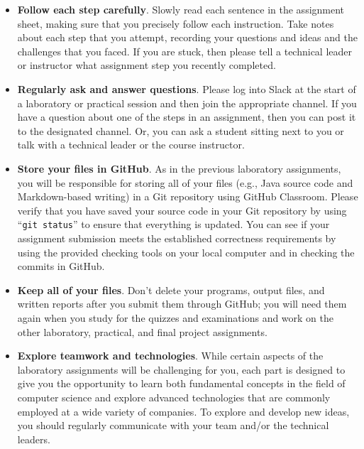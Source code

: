 \documentclass[11pt]{article}
\newcommand{\command}[1]{``\lstinline{#1}''}
\begin{document}
\begin{itemize}
  \setlength{\itemsep}{0pt}

\item {\bf Follow each step carefully}. Slowly read each sentence in the
  assignment sheet, making sure that you precisely follow each instruction. Take
  notes about each step that you attempt, recording your questions and ideas and
  the challenges that you faced. If you are stuck, then please tell a technical
  leader or instructor what assignment step you recently completed.

\item {\bf Regularly ask and answer questions}. Please log into Slack at the
  start of a laboratory or practical session and then join the appropriate
  channel. If you have a question about one of the steps in an assignment, then
  you can post it to the designated channel. Or, you can ask a student sitting
  next to you or talk with a technical leader or the course instructor.

\item {\bf Store your files in GitHub}. As in the previous laboratory
  assignments, you will be responsible for storing all of your files (e.g., Java
  source code and Markdown-based writing) in a Git repository using GitHub
  Classroom. Please verify that you have saved your source code in your Git
  repository by using \command{git status} to ensure that everything is updated.
  You can see if your assignment submission meets the established correctness
  requirements by using the provided checking tools on your local computer and
  in checking the commits in GitHub.

\item {\bf Keep all of your files}. Don't delete your programs, output files,
  and written reports after you submit them through GitHub; you will need them
  again when you study for the quizzes and examinations and work on the other
  laboratory, practical, and final project assignments.

\item {\bf Explore teamwork and technologies}. While certain aspects of the
  laboratory assignments will be challenging for you, each part is designed to
  give you the opportunity to learn both fundamental concepts in the field of
  computer science and explore advanced technologies that are commonly employed
  at a wide variety of companies. To explore and develop new ideas, you should
  regularly communicate with your team and/or the technical leaders.


\end{itemize}
\end{document}
